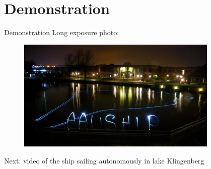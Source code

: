 
	\section{Demonstration}
	\begin{frame}{Demonstration}{}
		Long exposure photo:
		\begin{figure}
			\begin{center}
				\includegraphics[width=9.6cm]{img/aauship}
				\label{fig:aauship1}
			\end{center}
		\end{figure}
		Next: video of the ship sailing autonomously in lake Klingenberg
	\end{frame}